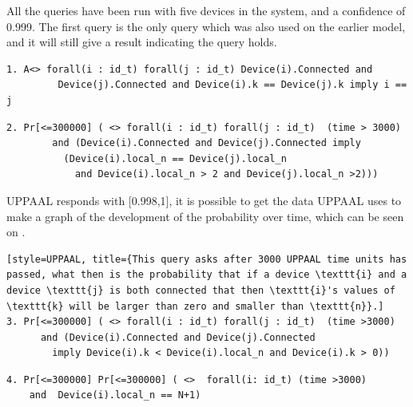 All the queries have been run with five devices in the system, and a confidence of 0.999.
The first query is the only query which was also used on the earlier model, and it will still give a result indicating the query holds.

\begin{lstlisting}[style=UPPAAL, title={This query requires that eventually if all devices are connected, then no pair of devices have the same \texttt{k}, unless the pair consists of the same two devices.}]
1. A<> forall(i : id_t) forall(j : id_t) Device(i).Connected and
         Device(j).Connected and Device(i).k == Device(j).k imply i == j
\end{lstlisting}


\begin{lstlisting}[style=UPPAAL, title={This query asks after 3000 UPPAAL time units has passed, what then is the probability that if two devices \texttt{i}, and \texttt{j} are connected to a network that  their local values of \texttt{n} are the same, and that they are both larger than 2. The query will keep checking the probability until it has been found to be 100\% certain or until 300000 UPPAAL time units has passed.}]
2. Pr[<=300000] ( <> forall(i : id_t) forall(j : id_t)  (time > 3000) 
	  	and (Device(i).Connected and Device(j).Connected imply 
	  	  (Device(i).local_n == Device(j).local_n 
	  		and Device(i).local_n > 2 and Device(j).local_n >2)))
\end{lstlisting}
\noindent
UPPAAL responds with [0.998,1], it is possible to get the data UPPAAL uses to make a graph of the development of the probability over time, which can be seen on .

\begin{lstlisting}[style=UPPAAL, title={This query asks after 3000 UPPAAL time units has passed, what then is the probability that if a device \texttt{i} and a device \texttt{j} is both connected that then \texttt{i}'s values of \texttt{k} will be larger than zero and smaller than \texttt{n}}.]
3. Pr[<=300000] ( <> forall(i : id_t) forall(j : id_t)  (time >3000) 
	  and (Device(i).Connected and Device(j).Connected 
	  	imply Device(i).k < Device(i).local_n and Device(i).k > 0))
\end{lstlisting}


\begin{lstlisting}[style=UPPAAL, title={This query asks after 3000 UPPAAL time units has passed, what then is the probability that a device \texttt{i} has a local value of \texttt{n} to be equal to the number of devices, which is \texttt{N} + 1, which means that all devices are in the same network.}]
4. Pr[<=300000] Pr[<=300000] ( <>  forall(i: id_t) (time >3000) 
	and  Device(i).local_n == N+1)
\end{lstlisting}

